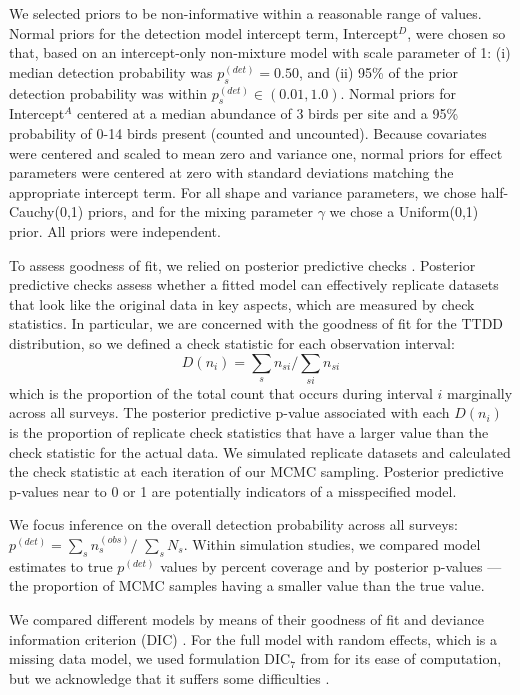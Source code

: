 \documentclass[useAMS,usenatbib,referee,12pt]{article}
\begin{document}
We selected priors to be non-informative within a reasonable range of values.  
Normal priors for the detection model intercept term, Intercept$^D$, were chosen so that, based on an intercept-only non-mixture model with scale parameter of 1: (i) median detection probability was $p_{s}^{(det)} = 0.50$, and (ii) 95\% of the prior detection probability was within $p_{s}^{(det)} \in (0.01, 1.0)$.  
Normal priors for Intercept$^A$ centered at a median abundance of 3 birds per site and a 95\% probability of 0-14 birds present (counted and uncounted).  
Because covariates were centered and scaled to mean zero and variance one, normal priors for effect parameters were centered at zero with standard deviations matching the appropriate intercept term.  
For all shape and variance parameters, we chose half-Cauchy(0,1) priors, and for the mixing parameter $\gamma$ we chose a Uniform(0,1) prior.  
All priors were independent.

To assess goodness of fit, we relied on posterior predictive checks \citep{Gelman1996}.  
Posterior predictive checks assess whether a fitted model can effectively replicate datasets that look like the original data in key aspects, which are measured by check statistics.  
In particular, we are concerned with the goodness of fit for the TTDD distribution, so we defined a check statistic for each observation interval:
\[D(n_i) = \sum\limits_{s} n_{si} \big/ \sum\limits_{si} n_{si}\]
which is the proportion of the total count that occurs during interval $i$ marginally across all surveys.  
The posterior predictive p-value associated with each $D(n_i)$ is the proportion of replicate check statistics that have a larger value than the check statistic for the actual data.  
We simulated replicate datasets and calculated the check statistic at each iteration of our MCMC sampling.  
Posterior predictive p-values near to 0 or 1 are potentially indicators of a misspecified model.

We focus inference on the overall detection probability across all surveys: $p^{(det)} = \sum\limits_{s}n_{s}^{(obs)}\big/$ $\sum\limits_{s}N_{s}$.  
Within simulation studies, we compared model estimates to true $p^{(det)}$ values by percent coverage and by posterior p-values --- the proportion of MCMC samples having a smaller value than the true value.  

We compared different models by means of their goodness of fit and deviance information criterion (DIC) \citep{Spiegelhalter2002}.  
For the full model with random effects, which is a missing data model, we used formulation DIC$_7$ from \citet{Celeux2006} for its ease of computation, but we acknowledge that it suffers some difficulties \citep{Celeux2006, Li2014}.
\end{document}
